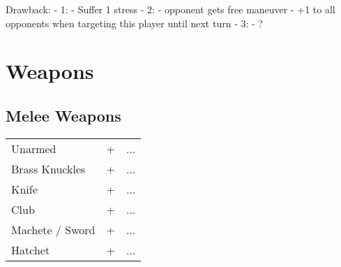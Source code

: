 Drawback:
  - 1:
      - Suffer 1 stress
  - 2:
      - opponent gets free maneuver
      - +1 to all opponents when targeting this player until next turn
  - 3:
      - ?
  
\pagebreak
\section{Weapons}

\newcommand{\weapontable}[4][2]{
    {
    \protect\renewcommand{\arraystretch}{1.2}%
    \renewcommand\tabularxcolumn[1]{m{##1}} %
    \small
    \begin{threeparttable}
        \begin{tabularx}{\linewidth}{@{}m{1.0in}*{#1}{>{\centering\arraybackslash}m{0.5in}}X@{}}
            #2
            \toprule
            #3
            \bottomrule
        \end{tabularx}
        \ifthenelse{\isempty{#4}}
        {}{
            \begin{tablenotes}
                \footnotesize
                #4
            \end{tablenotes}
        }
    \end{threeparttable}
    \par
    }
}

\subsection{Melee Weapons}
\weapontable[1]{
    \thead[l]{Weapon} & \thead{Damage} & \thead[l]{Effects}\\
}{
    Unarmed         & 0+    & ...\\ 
    Brass Knuckles  & 2+    & ...\\ 
    Knife           & 2+    & ...\\ 
    Club            & 3+    & ...\\
    Machete / Sword & 4+    & ...\\ 
    Hatchet         & 4+    & ...\\
}{
}

